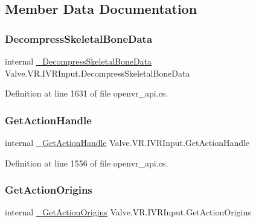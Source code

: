 \subsection{Member Data Documentation}
\mbox{\label{struct_valve_1_1_v_r_1_1_i_v_r_input_a878e073b942db8102323fc37e8e2174c}} 
\subsubsection{\texorpdfstring{DecompressSkeletalBoneData}{DecompressSkeletalBoneData}}
{\footnotesize\ttfamily internal \mbox{\hyperlink{struct_valve_1_1_v_r_1_1_i_v_r_input_ae399aa93e9fa3f84762ce5e124b7c6fb}{\+\_\+\+Decompress\+Skeletal\+Bone\+Data}} Valve.\+V\+R.\+I\+V\+R\+Input.\+Decompress\+Skeletal\+Bone\+Data}



Definition at line 1631 of file openvr\+\_\+api.\+cs.

\mbox{\label{struct_valve_1_1_v_r_1_1_i_v_r_input_a6cba75e1409add3973f61efe2a72c129}} 
\subsubsection{\texorpdfstring{GetActionHandle}{GetActionHandle}}
{\footnotesize\ttfamily internal \mbox{\hyperlink{struct_valve_1_1_v_r_1_1_i_v_r_input_a21380aa596ca906ff4b10666cf88065e}{\+\_\+\+Get\+Action\+Handle}} Valve.\+V\+R.\+I\+V\+R\+Input.\+Get\+Action\+Handle}



Definition at line 1556 of file openvr\+\_\+api.\+cs.

\mbox{\label{struct_valve_1_1_v_r_1_1_i_v_r_input_ad2713fbf01ae6a94d48816f5b07e6a4b}} 
\subsubsection{\texorpdfstring{GetActionOrigins}{GetActionOrigins}}
{\footnotesize\ttfamily internal \mbox{\hyperlink{struct_valve_1_1_v_r_1_1_i_v_r_input_a07748e313f1d66ea8b3455c15b5a35fe}{\+\_\+\+Get\+Action\+Origins}} Valve.\+V\+R.\+I\+V\+R\+Input.\+Get\+Action\+Origins}



